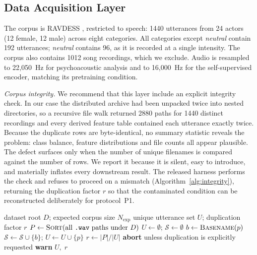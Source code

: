 \documentclass[journal,onecolumn,11pt,draftclsnofoot]{IEEEtran}   %
\begin{document}
\subsection{Data Acquisition Layer}
\label{sec:data}
The corpus is RAVDESS \cite{livingstone2018ravdess}, restricted to speech: 1440
utterances from 24 actors (12 female, 12 male) across eight categories. All
categories except \emph{neutral} contain 192 utterances; \emph{neutral} contains
96, as it is recorded at a single intensity. The corpus also contains 1012 song
recordings, which we exclude. Audio is resampled to 22{,}050~Hz for
psychoacoustic analysis and to 16{,}000~Hz for the self-supervised encoder,
matching its pretraining condition.

\emph{Corpus integrity.} We recommend that this layer include an explicit
integrity check. In our case the distributed archive had been unpacked twice
into nested directories, so a recursive file walk returned 2880 paths for 1440
distinct recordings and every derived feature table contained each utterance
exactly twice. Because the duplicate rows are byte-identical, no summary
statistic reveals the problem: class balance, feature distributions and file
counts all appear plausible. The defect surfaces only when the number of unique
filenames is compared against the number of rows. We report it because it is
silent, easy to introduce, and materially inflates every downstream result. The
released harness performs the check and refuses to proceed on a mismatch
(Algorithm~\ref{alg:integrity}), returning the duplication factor $r$ so that
the contaminated condition can be reconstructed deliberately for protocol~P1.

\begin{algorithm}[!t]
\caption{Corpus integrity verification}
\label{alg:integrity}
\begin{algorithmic}[1]
\Require dataset root $D$; expected corpus size $N_{\mathrm{exp}}$
\Ensure unique utterance set $U$; duplication factor $r$
\State $P \gets \textsc{Sort}(\text{all \texttt{.wav} paths under } D)$
\State $U \gets \emptyset$; \; $\mathcal{S} \gets \emptyset$
  \State $b \gets \textsc{Basename}(p)$
    \State $\mathcal{S} \gets \mathcal{S} \cup \{b\}$; \;
           $U \gets U \cup \{p\}$
  \EndIf
\EndFor
\State $r \gets |P| / |U|$
  \State \textbf{abort} unless duplication is explicitly requested
  \Statex {}
\EndIf
{} \State \textbf{warn} \EndIf
\State \Return $U,\; r$
\end{algorithmic}
\end{algorithm}
\end{document}
